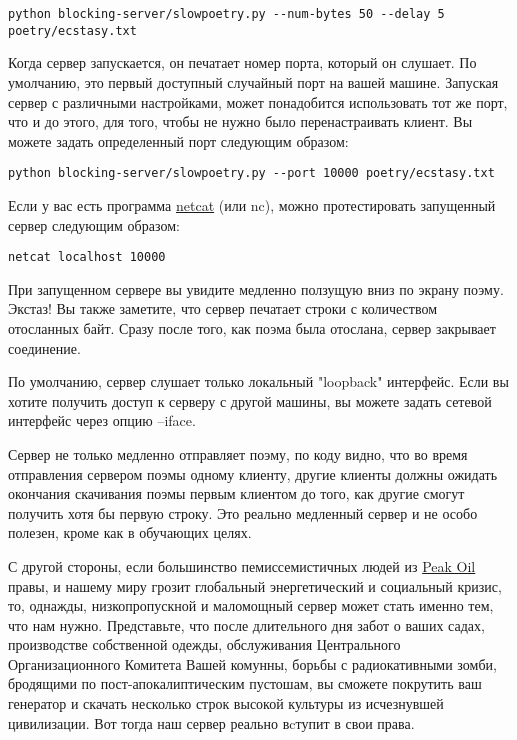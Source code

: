 \begin{verbatim}
python blocking-server/slowpoetry.py --num-bytes 50 --delay 5 poetry/ecstasy.txt
\end{verbatim}


Когда сервер запускается, он печатает номер порта, который он 
слушает. По умолчанию, это первый доступный случайный порт на вашей машине. 
Запуская сервер с различными настройками, может понадобится использовать 
тот же порт, что и до этого, для того, чтобы не нужно было 
перенастраивать клиент. Вы можете задать определенный порт следующим образом:

\begin{verbatim}
python blocking-server/slowpoetry.py --port 10000 poetry/ecstasy.txt
\end{verbatim}

Если у вас есть программа 
\href{http://netcat.sourceforge.net/}{netcat} (или nc), можно протестировать 
запущенный сервер следующим образом:

\begin{verbatim}
netcat localhost 10000
\end{verbatim}


При запущенном сервере вы увидите медленно ползущую 
вниз по экрану поэму. Экстаз! Вы также заметите, что сервер 
печатает строки с количеством отосланных байт. Сразу после того, как 
поэма была отослана, сервер закрывает соединение.


По умолчанию, сервер слушает только локальный "loopback" 
интерфейс. Если вы хотите получить доступ к серверу с 
другой машины, вы можете задать сетевой интерфейс через 
опцию --iface.


Сервер не только медленно отправляет поэму, по коду видно, что 
во время отправления сервером поэмы одному клиенту, другие 
клиенты должны ожидать окончания скачивания поэмы первым клиентом 
до того, как другие смогут получить хотя бы первую строку. 
Это реально медленный сервер и не особо полезен, кроме как 
в обучающих целях. 


С другой стороны, если большинство пемиссемистичных 
людей из 
\href{http://www.peakoil.net/}{Peak Oil} правы, и нашему миру грозит 
глобальный энергетический и социальный кризис, то, однажды, 
низкопропускной и маломощный сервер может стать именно тем, что нам 
нужно. Представьте, что после длительного дня забот о ваших 
садах, производстве собственной одежды, обслуживания 
Центрального Организационного Комитета Вашей комунны, борьбы 
с радиокативными зомби, бродящими по пост-апокалиптическим 
пустошам, вы сможете покрутить ваш генератор и скачать 
несколько строк высокой культуры из исчезнувшей цивилизации. 
Вот тогда наш сервер реально вcтупит в свои права. 


